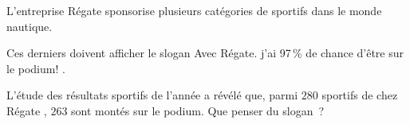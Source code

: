 \bigbreak
{}
\medbreak
L'entreprise \og Régate \fg sponsorise plusieurs catégories de sportifs dans le monde nautique.
\par
Ces derniers doivent afficher le slogan \og Avec Régate. j'ai 97\,\% de chance d'être sur le podium! \fg.
\par
L'étude des résultats sportifs de l'année a révélé que, parmi $280$ sportifs de chez \og Régate \fg, $263$ sont montés sur le podium. Que penser du slogan~?
\medbreak
